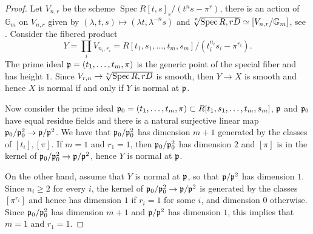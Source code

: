 \documentclass{amsart}
\numberwithin{equation}{section}
\numberwithin{subsection}{section}
\theoremstyle{definition}
\theoremstyle{remark}
\newcommand\GG{\mathbb{G}} \newcommand\HH{\mathbb{H}}
\newcommand\spec{\operatorname{Spec}}
\newcommand\radice[2][\relax]{\hspace{-1.5pt}\sqrt[\uproot{2}#1]{#2}}
\begin{document}
\begin{proof}
	Let $V_{n,r}$ be the scheme $\spec R[t,s]_{s}/(t^{n}s-\pi^{r})$, there is an action of $\GG_{m}$ on $V_{n,r}$ given by $(\lambda,t,s) \mapsto (\lambda t,\lambda^{-n}s)$ and $\radice[n]{\spec R,rD}\simeq [V_{n,r}/\GG_{m}]$, see \cite[Appendix B]{dan-tom-angelo2008}. Consider the fibered product 
	\[Y=\prod_{i}V_{n_{i},r_{i}}=R[t_{1},s_{1},\dots,t_{m},s_{m}]/(t_{i}^{n_{i}}s_{i}-\pi^{r_{i}}).\]
	The prime ideal $\mathfrak{p}=(t_{1},\dots,t_{m},\pi)$ is the generic point of the special fiber and has height $1$. Since $V_{r,n}\to\radice[n]{\spec R,rD}$ is smooth, then $Y\to X$ is smooth and hence $X$ is normal if and only if $Y$ is normal at $\mathfrak{p}$.
	
	Now consider the prime ideal $\mathfrak{p}_{0}=(t_{1},\dots,t_{m},\pi)\subset R[t_{1},s_{1},\dots,t_{m},s_{m}]$, $\mathfrak{p}$ and $\mathfrak{p}_{0}$ have equal residue fields and there is a natural surjective linear map $\mathfrak{p}_{0}/\mathfrak{p}_{0}^{2}\to\mathfrak{p}/\mathfrak{p}^{2}$. We have that $\mathfrak{p}_{0}/\mathfrak{p}_{0}^{2}$ has dimension $m+1$ generated by the classes of $[t_{i}],[\pi]$. If $m=1$ and $r_{1}=1$, then $\mathfrak{p}_{0}/\mathfrak{p}_{0}^{2}$ has dimension $2$ and $[\pi]$ is in the kernel of $\mathfrak{p}_{0}/\mathfrak{p}_{0}^{2}\to\mathfrak{p}/\mathfrak{p}^{2}$, hence $Y$ is normal at $\mathfrak{p}$.
	
	On the other hand, assume that $Y$ is normal at $\mathfrak{p}$, so that $\mathfrak{p}/\mathfrak{p}^{2}$ has dimension $1$. Since $n_{i}\ge 2$ for every $i$, the kernel of $\mathfrak{p}_{0}/\mathfrak{p}_{0}^{2}\to\mathfrak{p}/\mathfrak{p}^{2}$ is generated by the classes $[\pi^{r_{i}}]$ and hence has dimension $1$ if $r_{i}=1$ for some $i$, and dimension $0$ otherwise. Since $\mathfrak{p}_{0}/\mathfrak{p}_{0}^{2}$ has dimension $m+1$ and $\mathfrak{p}/\mathfrak{p}^{2}$ has dimension $1$, this implies that $m=1$ and $r_{1}=1$.
\end{proof}
\end{document}
